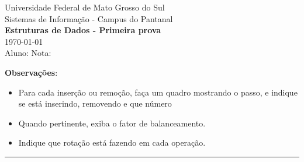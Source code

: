 

\begin{center}
  Universidade Federal de Mato Grosso do Sul \\
  Sistemas de Informação - Campus do Pantanal \\
  \vspace{1em}
  \textbf{Estruturas de Dados - Primeira prova} \\
  \vspace{1em}
  \today \\
  \vspace{1em}
  Aluno: \makebox[10cm]{\hrulefill} Nota: \makebox[2cm]{\hrulefill}


  \vspace{1em}
  \textbf{Observações}: 
  \begin{itemize}
    \item Para cada inserção ou remoção, faça um quadro mostrando o passo, e indique se está inserindo, removendo e que número
    \item Quando pertinente, exiba o fator de balanceamento.
    \item Indique que rotação está fazendo em cada operação.
  \end{itemize}
\end{center}
  \extraheadheight{-0.8in}
  \vspace{3em}
  \vspace{0.1in}
  \hrule
 

